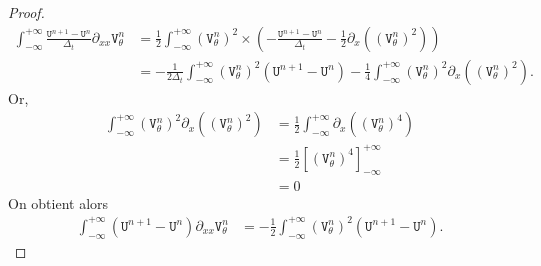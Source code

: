 \documentclass[12pt,a4paper]{article}
\numberwithin{equation}{section}
\begin{document}
\begin{proof}
\begin{equation*}
\begin{split}
    \int_{-\infty}^{+\infty}\frac{\texttt{U}^{n+1}-\texttt{U}^n}{\Delta_t}\partial_{xx}\texttt{V}_\theta^n
    &= \frac{1}{2}\int_{-\infty}^{+\infty} \left(\texttt{V}_\theta^n\right)^2 \times \left( -\frac{\texttt{U}^{n+1} - \texttt{U}^{n} }{\Delta_t} - \frac{1}{2}\partial_x((\texttt{V}_\theta^n)^2)\right) \\
    &= -\frac{1}{2\Delta_t}\int_{-\infty}^{+\infty} \left(\texttt{V}_\theta^n\right)^2 (\texttt{U}^{n+1} - \texttt{U}^{n}) - \frac{1}{4}\int_{-\infty}^{+\infty}\left(\texttt{V}_\theta^n\right)^2\partial_x(\left(\texttt{V}_\theta^n\right)^2) .
\end{split}
\end{equation*}
Or, 
\begin{equation*}
\begin{split}
    \int_{-\infty}^{+\infty}\left(\texttt{V}_\theta^n\right)^2\partial_x(\left(\texttt{V}_\theta^n\right)^2)
    &= \frac{1}{2}\int_{-\infty}^{+\infty} \partial_x(\left(\texttt{V}_\theta^n\right)^4)\\
    &= \frac{1}{2}\left[\left(\texttt{V}_\theta^n\right)^4\right]_{-\infty}^{+\infty}\\
    &= 0
\end{split}
\end{equation*}
On obtient alors
\begin{equation}\label{energy_theta_dem1}
\begin{split}
    \int_{-\infty}^{+\infty}(\texttt{U}^{n+1}-\texttt{U}^n)\partial_{xx}\texttt{V}_\theta^n
    &= -\frac{1}{2}\int_{-\infty}^{+\infty} \left(\texttt{V}_\theta^n\right)^2 (\texttt{U}^{n+1} - \texttt{U}^{n}) .
\end{split}
\end{equation}


\end{proof}
\end{document}
